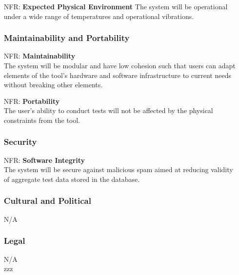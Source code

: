 \documentclass[12pt]{article}
\newcounter{nfrnum} %
\begin{document}
\begin{itemize}
    \item[NFR\refstepcounter{nfrnum}\thenfrnum:]
    \textbf{Expected Physical Environment}
    The system will be operational under a wide range of temperatures and operational vibrations.\\

\subsubsection{Maintainability and Portability}

    \item[NFR\refstepcounter{nfrnum}\thenfrnum:]
      \textbf{Maintainability}\\
    The system will be modular and have low cohesion such that users can adapt elements of the tool's hardware and software infrastructure to current needs without breaking other elements.\\

    \item[NFR\refstepcounter{nfrnum}\thenfrnum:]
    \textbf{Portability}\\
    The user's ability to conduct tests will not be affected by the physical constraints from the tool.\\
  
\subsubsection{Security}

    \item[NFR\refstepcounter{nfrnum}\thenfrnum:]
    \textbf{Software Integrity}\\
    The system will be secure against malicious spam aimed at reducing validity of aggregate test data stored in the database.\\

\subsubsection{Cultural and Political}

    N/A\\

\subsubsection{Legal}

    N/A\\zzz

\end{itemize}
\end{document}
